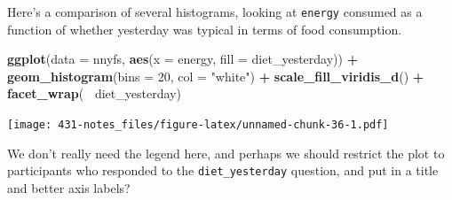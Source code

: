 \documentclass[
]{book}
\newenvironment{Shaded}{\begin{snugshade}}{\end{snugshade}}
\newcommand{\DataTypeTok}[1]{\textcolor[rgb]{0.13,0.29,0.53}{#1}}
\newcommand{\DecValTok}[1]{\textcolor[rgb]{0.00,0.00,0.81}{#1}}
\newcommand{\KeywordTok}[1]{\textcolor[rgb]{0.13,0.29,0.53}{\textbf{#1}}}
\newcommand{\NormalTok}[1]{#1}
\newcommand{\OperatorTok}[1]{\textcolor[rgb]{0.81,0.36,0.00}{\textbf{#1}}}
\newcommand{\OtherTok}[1]{\textcolor[rgb]{0.56,0.35,0.01}{#1}}
\newcommand{\StringTok}[1]{\textcolor[rgb]{0.31,0.60,0.02}{#1}}
\begin{document}
Here's a comparison of several histograms, looking at \texttt{energy} consumed as a function of whether yesterday was typical in terms of food consumption.

\begin{Shaded}
\begin{Highlighting}[]
\KeywordTok{ggplot}\NormalTok{(}\DataTypeTok{data =}\NormalTok{ nnyfs, }\KeywordTok{aes}\NormalTok{(}\DataTypeTok{x =}\NormalTok{ energy, }\DataTypeTok{fill =}\NormalTok{ diet_yesterday)) }\OperatorTok{+}
\StringTok{  }\KeywordTok{geom_histogram}\NormalTok{(}\DataTypeTok{bins =} \DecValTok{20}\NormalTok{, }\DataTypeTok{col =} \StringTok{"white"}\NormalTok{) }\OperatorTok{+}
\StringTok{  }\KeywordTok{scale_fill_viridis_d}\NormalTok{() }\OperatorTok{+}
\StringTok{  }\KeywordTok{facet_wrap}\NormalTok{(}\OperatorTok{~}\StringTok{ }\NormalTok{diet_yesterday)}
\end{Highlighting}
\end{Shaded}

\texttt{[image: 431-notes\_files/figure-latex/unnamed-chunk-36-1.pdf]}

We don't really need the legend here, and perhaps we should restrict the plot to participants who responded to the \texttt{diet\_yesterday} question, and put in a title and better axis labels?

\begin{Shaded}
\end{Shaded}
\end{document}
